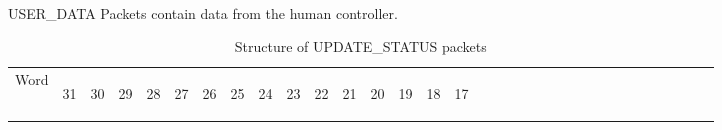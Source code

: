 \documentclass[11pt]{article}
\begin{document}
\paragraph{}
USER\_DATA Packets contain data from the human controller.
\begin{table}[h!]
    \centering
    \label{tab:updateStatusDef}
    \caption{Structure of UPDATE\_STATUS packets}
    \begin{tabular}{|p{1cm}|p{0.04cm}|p{0.04cm}|m{0.04cm}|m{0.04cm}|m{0.04cm}|m{0.04cm}|m{0.04cm}|m{0.04cm}|m{0.04cm}|
        m{0.04cm}|m{0.04cm}|m{0.04cm}|m{0.04cm}|m{0.04cm}|m{0.04cm}|m{0.04cm}|m{0.04cm}|m{0.04cm}|m{0.04cm}|m{0.04cm}|
        m{0.04cm}|m{0.04cm}|m{0.04cm}|m{0.04cm}|m{0.04cm}|m{0.04cm}|m{0.04cm}|m{0.04cm}|m{0.04cm}|m{0.04cm}|m{0.04cm}|m{0.04cm}|}
        \hline
        Word & 
        \begin{sideways}31\end{sideways} &
        \begin{sideways}30\end{sideways} & 
        \begin{sideways}29\end{sideways} &
        \begin{sideways}28\end{sideways} &
        \begin{sideways}27\end{sideways} &
        \begin{sideways}26\end{sideways} &
        \begin{sideways}25\end{sideways} &
        \begin{sideways}24\end{sideways} &
        \begin{sideways}23\end{sideways} &
        \begin{sideways}22\end{sideways} &
        \begin{sideways}21\end{sideways} &
        \begin{sideways}20\end{sideways} &
        \begin{sideways}19\end{sideways} &
        \begin{sideways}18\end{sideways} &
        \begin{sideways}17\end{sideways} &

\end{tabular}
\end{table}
\end{document}
